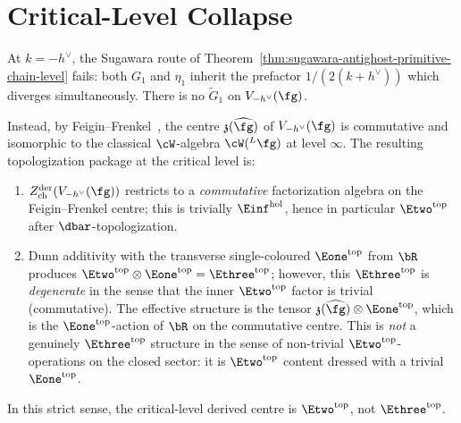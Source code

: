 \section{Critical-Level Collapse}
\label{sec:critical-level-collapse}

\begin{proposition}
\label{prop:critical-level-collapse}
\ClaimStatusProvedHere
At $k = -h^\vee$, the Sugawara route of
Theorem~\ref{thm:sugawara-antighost-primitive-chain-level} fails:
both $G_1$ and $\eta_1$ inherit the prefactor $1/(2(k+h^\vee))$
which diverges simultaneously. There is no $\widetilde G_1$ on
$V_{-h^\vee}(\fg)$.

Instead, by Feigin--Frenkel~\cite{FeiginFrenkel92}, the centre
$\mathfrak{z}(\widehat{\fg})$ of $V_{-h^\vee}(\fg)$ is commutative
and isomorphic to the classical $\cW$-algebra
$\cW(^L\fg)$ at level $\infty$. The resulting topologization
package at the critical level is:
\begin{enumerate}
 \item $Z^{\mathrm{der}}_{\mathrm{ch}}(V_{-h^\vee}(\fg))$ restricts
 to a \emph{commutative} factorization algebra on the
 Feigin--Frenkel centre; this is trivially
 $\Einf^{\mathrm{hol}}$, hence in particular
 $\Etwo^{\mathrm{top}}$ after $\dbar$-topologization.
 \item Dunn additivity with the transverse single-coloured
 $\Eone^{\mathrm{top}}$ from $\bR$ produces
 $\Etwo^{\mathrm{top}} \otimes \Eone^{\mathrm{top}}
 = \Ethree^{\mathrm{top}}$; however, this $\Ethree^{\mathrm{top}}$
 is \emph{degenerate} in the sense that the inner
 $\Etwo^{\mathrm{top}}$ factor is trivial (commutative).
 The effective structure is the tensor
 $\mathfrak{z}(\widehat{\fg}) \otimes \Eone^{\mathrm{top}}$,
 which is the $\Eone^{\mathrm{top}}$-action of
 $\bR$ on the commutative centre. This is \emph{not} a genuinely
 $\Ethree^{\mathrm{top}}$ structure in the sense of non-trivial
 $\Etwo^{\mathrm{top}}$-operations on the closed sector: it is
 $\Etwo^{\mathrm{top}}$ content dressed with a trivial
 $\Eone^{\mathrm{top}}$.
\end{enumerate}
In this strict sense, the critical-level derived centre is
$\Etwo^{\mathrm{top}}$, not $\Ethree^{\mathrm{top}}$.
\end{proposition}

